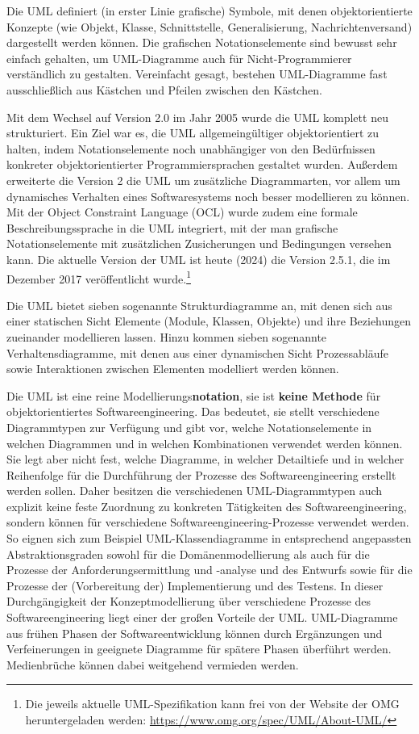 Die UML definiert (in erster Linie grafische) Symbole, mit denen objektorientierte Konzepte (wie \zb Objekt, Klasse, Schnittstelle, Generalisierung, Nachrichten\-versand) dargestellt werden können. Die grafischen Notationselemente sind bewusst sehr einfach gehalten, um UML-Diagramme auch für Nicht-Programmierer verständlich zu gestalten. Vereinfacht gesagt, bestehen UML-Diagramme fast ausschließlich aus Kästchen und Pfeilen zwischen den Kästchen. 

Mit dem Wechsel auf Version 2.0 im Jahr 2005 wurde die UML komplett neu strukturiert. Ein Ziel war es, die UML allgemeingültiger objektorientiert zu halten, indem Notationselemente noch unabhängiger von den Bedürfnissen konkreter objektorientierter Programmiersprachen gestaltet wurden. Außerdem erweiterte die Version 2 die UML um zusätzliche Diagrammarten, vor allem um dynamisches Verhalten eines Softwaresystems noch besser modellieren zu können. Mit der Object Constraint Language 
(OCL) wurde zudem eine formale Beschreibungssprache in die UML integriert, mit der man grafische Notationselemente mit zusätzlichen Zusicherungen und Bedingungen versehen kann. Die aktuelle Version der UML ist heute (2024) die Version 2.5.1, die im Dezember 2017 veröffentlicht wurde.\footnote{Die jeweils aktuelle UML-Spezifikation kann frei von der Website der OMG heruntergeladen werden: \url{https://www.omg.org/spec/UML/About-UML/}}

Die UML bietet sieben sogenannte Strukturdiagramme an, mit denen sich aus einer statischen Sicht Elemente (\zb Module, Klassen, Objekte) und ihre Beziehungen zueinander modellieren lassen. Hinzu kommen sieben sogenannte Verhaltens\-diagramme, mit denen aus einer dynamischen Sicht Prozessabläufe sowie Inter\-aktionen zwischen Elementen modelliert werden können.

Die UML ist eine reine Modellierungs\textbf{notation}, sie ist \textbf{keine Methode} für objekt\-orientiertes Softwareengineering. Das bedeutet, sie stellt verschiedene Diagrammtypen zur Verfügung und gibt vor, welche Notationselemente in welchen Diagrammen und in welchen Kombinationen verwendet werden können. Sie legt aber nicht fest, welche Diagramme, in welcher Detailtiefe und in welcher Reihenfolge für die Durchführung der Prozesse des Softwareengineering erstellt werden sollen. Daher besitzen die verschiedenen UML-Diagrammtypen auch explizit keine feste Zuordnung zu konkreten Tätigkeiten des Softwareengineering, sondern können für verschiedene Software\-engi\-neering-Prozesse verwendet werden. So eignen sich zum Beispiel UML-Klassen\-dia\-gramme in entsprechend angepassten Abstraktionsgraden sowohl für die Domänenmodellierung als auch für die Prozesse der Anforderungsermittlung und -analyse und des Entwurfs sowie für die Prozesse der (Vorbereitung der) Implementierung und des Testens. In dieser
Durchgängigkeit der Konzeptmodellierung über verschiedene Prozesse des Softwareengineering liegt einer der großen Vorteile der UML. UML-Diagramme aus frühen Phasen der Softwareentwicklung können durch Ergänzungen und Verfeinerungen in geeignete Diagramme für spätere Phasen überführt werden. Medienbrüche können dabei weitgehend vermieden werden.

